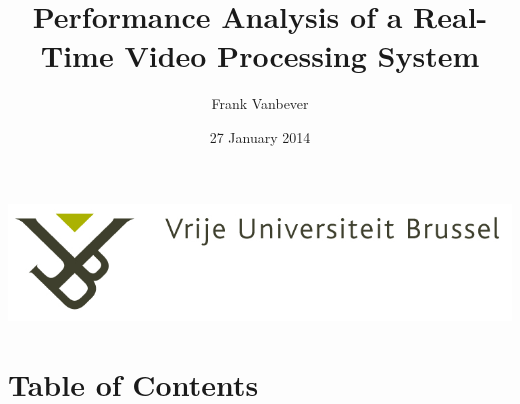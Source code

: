 \documentclass{beamer}
\title{Performance Analysis of a Real-Time Video Processing System}
\author{Frank Vanbever}
\date{27 January 2014}
\begin{document}
\begin{frame}[plain]
\includegraphics[width=0.4\paperwidth]{VUB_logo.jpg}
\vspace{2cm}
\titlepage
\end{frame}



%
%
%
%


\section{Table of Contents}
\end{document}

